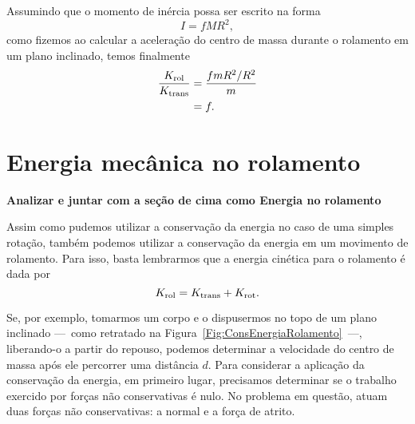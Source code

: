 Assumindo que o momento de inércia possa ser escrito na forma
\begin{equation}
    I = f MR^2,
\end{equation}
%
como fizemos ao calcular a aceleração do centro de massa durante o rolamento em um plano inclinado, temos finalmente
\begin{align}
    \frac{K_{\rm{rol}}}{K_{\rm{trans}}} &= \frac{f mR^2 /R^2}{m} \\
    &= f.
\end{align}

\section{Energia mecânica no rolamento}

\textbf{Analizar e juntar com a seção de cima como Energia no rolamento}


Assim como pudemos utilizar a conservação da energia no caso de uma simples rotação, também podemos utilizar a conservação da energia em um movimento de rolamento. Para isso, basta lembrarmos que a energia cinética para o rolamento é dada por
\begin{equation}
    K_{\rm{rol}} = K_{\rm{trans}} + K_{\rm{rot}}.
\end{equation}

Se, por exemplo, tomarmos um corpo e o dispusermos no topo de um plano inclinado ---~como retratado na Figura~\ref{Fig:ConsEnergiaRolamento}~---, liberando-o a partir do repouso, podemos determinar a velocidade do centro de massa após ele percorrer uma distância $d$. Para considerar a aplicação da conservação da energia, em primeiro lugar, precisamos determinar se o trabalho exercido por forças não conservativas é nulo. No problema em questão, atuam duas forças não conservativas: a normal e a força de atrito.

